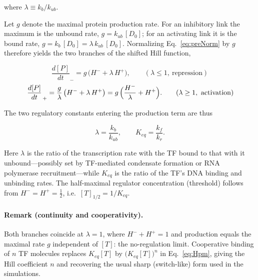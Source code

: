 where $\lambda \equiv k_b / k_{ub}$.

Let $g$ denote the maximal protein production rate. For an inhibitory link the
maximum is the unbound rate, $g = k_{ub}\,[D_0]$; for an activating link it is the
bound rate, $g = k_{b}\,[D_0] = \lambda\,k_{ub}\,[D_0]$. Normalizing
Eq.~\eqref{eq:preNorm} by $g$ therefore yields the two branches of the shifted
Hill function,

\begin{equation}
    \left.\frac{d[P]}{dt}\right._{-}
        = g\,\bigl(H^{-} + \lambda\,H^{+}\bigr),
    \qquad (\lambda \le 1,\ \text{repression})
    \label{eq:branchRep}
\end{equation}
\begin{equation}
    \left.\frac{d[P]}{dt}\right._{+}
        = \frac{g}{\lambda}\,\bigl(H^{-} + \lambda\,H^{+}\bigr)
        = g\,\Bigl(\frac{H^{-}}{\lambda} + H^{+}\Bigr).
    \qquad (\lambda \ge 1,\ \text{activation})
    \label{eq:branchAct}
\end{equation}

The two regulatory constants entering the production term are thus

\begin{equation}
    \lambda = \frac{k_b}{k_{ub}},
    \qquad
    K_{eq} = \frac{k_f}{k_r}.
\end{equation}

Here $\lambda$ is the ratio of the transcription rate with the TF bound to that
with it unbound---possibly set by TF-mediated condensate formation or RNA
polymerase recruitment---while $K_{eq}$ is the ratio of the TF's DNA binding and
unbinding rates. The half-maximal regulator concentration (threshold) follows
from $H^{-} = H^{+} = \tfrac{1}{2}$, i.e.\ $[T]_{1/2} = 1/K_{eq}$.

\paragraph{Remark (continuity and cooperativity).}
Both branches coincide at $\lambda = 1$, where $H^{-} + H^{+} = 1$ and production
equals the maximal rate $g$ independent of $[T]$: the no-regulation limit.
Cooperative binding of $n$ TF molecules replaces $K_{eq}[T]$ by
$\bigl(K_{eq}[T]\bigr)^{n}$ in Eq.~\eqref{eq:Hpm}, giving the Hill coefficient $n$
and recovering the usual sharp (switch-like) form used in the simulations.